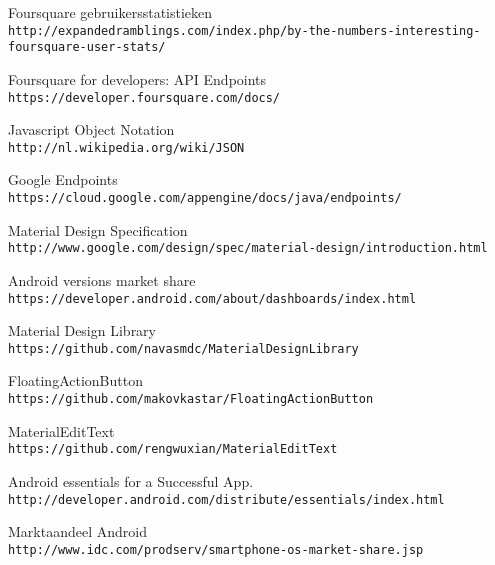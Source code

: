 \begin{thebibliography}{9}


Foursquare gebruikersstatistieken
\\\texttt{http://expandedramblings.com/index.php/by-the-numbers-interesting-foursquare-user-stats/}

Foursquare for developers: API Endpoints
\\\texttt{https://developer.foursquare.com/docs/}

Javascript Object Notation
\\\texttt{http://nl.wikipedia.org/wiki/JSON}

Google Endpoints
\\\texttt{https://cloud.google.com/appengine/docs/java/endpoints/}

Material Design Specification
\\\texttt{http://www.google.com/design/spec/material-design/introduction.html}

Android versions market share
\\\texttt{https://developer.android.com/about/dashboards/index.html}

Material Design Library
\\\texttt{https://github.com/navasmdc/MaterialDesignLibrary}

FloatingActionButton
\\\texttt{https://github.com/makovkastar/FloatingActionButton}

MaterialEditText
\\\texttt{https://github.com/rengwuxian/MaterialEditText}

Android essentials for a Successful App.
\\\texttt{http://developer.android.com/distribute/essentials/index.html}


Marktaandeel Android
\\\texttt{http://www.idc.com/prodserv/smartphone-os-market-share.jsp}


\end{thebibliography}





